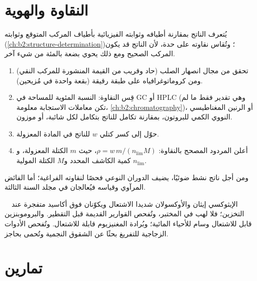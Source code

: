 \section{النقاوة والهوية}

يُتعرف الناتج بمقارنة أطيافه وثوابته الفيزيائية بأطياف المركب المتوقع وثوابته
(\cref{ch:b2:structure-determination})؛ وتُقاس نقاوته على حدة، لأن الناتج
قد يكون المركب الصحيح ومع ذلك يحوي بضعة بالمئة من شيء آخر.

\begin{method}\label{met:b2:lab-techniques-2:purity}
\begin{enumerate}
  \item تحقق من مجال انصهار الصلب (حاد وقريب من القيمة المنشورة للمركب
        النقي) ومن كروماتوغرافياه على طبقة رقيقة (بقعة واحدة في مُزيحين).
  \item قِس النقاوة: النسبة المئوية للمساحة في GC أو HPLC (وهي تقدير فقط ما لم تكن معاملات الاستجابة معلومة،
        \cref{ch:b2:chromatography})، أو الرنين المغناطيسي النووي الكمي للبروتون، بمقارنة تكامل للناتج
        بتكامل لكل شائبة، أو  موزون.
  \item حوّل إلى كسر كتلي $w$ للناتج في المادة المعزولة.
  \item أعلن المردود المصحح بالنقاوة: $\rho = w\,m/(n_{\mathrm{lim}}M)$، حيث $m$
        الكتلة المعزولة، و$n_{\mathrm{lim}}$ كمية الكاشف المحدد و$M$ الكتلة المولية.
\end{enumerate}
\end{method}

ومن أجل ناتج نشط ضوئيًا، يضيف الدوران النوعي فحصًا لنقاوته الفراغية؛ أما
الفائض المرآوي وقياسه فيُعالجان في مجلد السنة الثالثة.

\begin{safety}{\,\,\,\,}
الإيثوكسي إيثان والأوكسولان شديدا الاشتعال ويكوّنان فوق أكاسيد متفجرة عند التخزين؛ فلا لهب في
المختبر، وتُفحص القوارير القديمة قبل التقطير. والبروموبنزين قابل للاشتعال وسام للأحياء
المائية؛ وبُرادة المغنيزيوم قابلة للاشتعال. وتُفحص الأدوات الزجاجية للتفريغ بحثًا عن الشقوق النجمية وتُحمى بحاجز.
\end{safety}

\section{تمارين}

